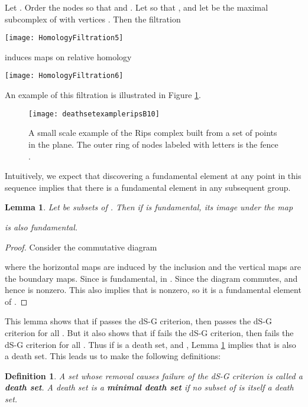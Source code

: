 \documentclass[10pt,twocolumn]{article} \usepackage{amsmath,epsf,amssymb,cite,pifont,amsthm, mathrsfs,epsfig,  bbm, amsthm,  setspace}
\newtheorem{lemma}{Lemma}
\newtheorem{defn}{Definition}
\renewcommand{\1}{\mathbbm{1}}
\begin{document}
Let .
Order the nodes so that
 and .
Let  so that ,
and let  be the maximal subcomplex of  with vertices .
Then the filtration
\begin{center}
 \texttt{[image: HomologyFiltration5]}
\end{center}
induces maps on relative homology
\begin{center}
 \texttt{[image: HomologyFiltration6]}
\end{center}
An example of this filtration is illustrated in Figure \ref{fig: rips complex example}.
\begin{figure}[ht]
\begin{center}
\texttt{[image: deathsetexampleripsB10]}
\end{center}
\caption{ A small scale example of the Rips complex  built from a set of points in the plane.
The outer ring of nodes labeled with letters is the fence .} \label{fig: rips complex example}
\end{figure}
Intuitively, we expect that discovering a fundamental element at any point in this sequence implies
that there is a fundamental element in any subsequent group.

 \begin{lemma}\label{L:map}
Let  be subsets of .  Then if  is fundamental,  its image under the map

is also  fundamental.
\end{lemma}

  \begin{proof}
 Consider the commutative diagram
 
 where the horizontal maps are induced by the inclusion  and the vertical maps are the boundary maps.
Since  is fundamental,   in .
Since the diagram commutes,  and hence is nonzero.
This also implies that  is nonzero, so it is a fundamental element of .
  \end{proof}

This lemma shows that if   passes the dS-G criterion,
then  passes the dS-G criterion for all .
But it also shows that if  fails the dS-G criterion, then  fails the dS-G  criterion for all
.
Thus if   is a death set, and ,
Lemma \ref{L:map} implies that  is also a death set.
This leads us to make the following definitions:

\begin{defn}
A set  whose removal causes failure of the dS-G criterion is called a
\textbf{death set}.
A death set  is a \textbf{minimal death set} if no subset of  is itself a death set.
\end{defn}
\end{document}
